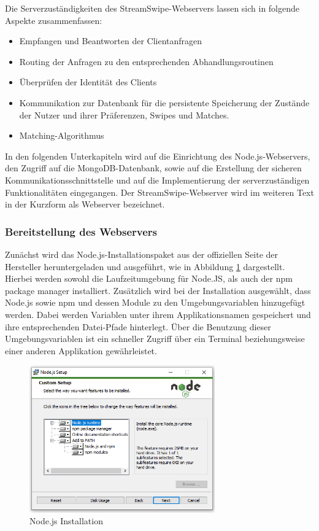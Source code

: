 Die Serverzuständigkeiten des StreamSwipe-Webservers lassen sich in folgende Aspekte zusammenfassen:
\begin{itemize}
\item Empfangen und Beantworten der Clientanfragen
\item Routing der Anfragen zu den entsprechenden Abhandlungsroutinen
\item Überprüfen der Identität des Clients
\item Kommunikation zur Datenbank für die persistente Speicherung der Zustände der Nutzer und ihrer Präferenzen, Swipes und Matches.
\item Matching-Algorithmus
\end{itemize} 

\noindent
In den folgenden Unterkapiteln wird auf die Einrichtung des Node.js-Webservers, den Zugriff auf die MongoDB-Datenbank, sowie auf die Erstellung der sicheren Kommunikationsschnittstelle und auf die Implementierung der serverzuständigen Funktionalitäten eingegangen. Der StreamSwipe-Webserver wird im weiteren Text in der Kurzform als Webserver bezeichnet. 

\subsubsection{Bereitstellung des Webservers}
Zunächst wird das Node.js-Installationspaket aus der offiziellen Seite der Hersteller heruntergeladen und ausgeführt, wie in Abbildung \ref{fig:installation_nodejs} dargestellt. Hierbei werden sowohl die Laufzeitumgebung für Node.JS, als auch der npm package manager installiert. 
Zusätzlich wird bei der Installation ausgewählt, dass Node.js sowie npm und dessen Module zu den Umgebungsvariablen hinzugefügt werden. Dabei werden Variablen unter ihrem Applikationsnamen gespeichert und ihre entsprechenden Datei-Pfade hinterlegt.
Über die Benutzung dieser Umgebungsvariablen ist ein schneller Zugriff über ein Terminal beziehungsweise einer anderen Applikation gewährleistet.


\begin{figure}[tbt]
\centering
\includegraphics[width=8cm]{images/nodejs_install.png}
\caption{Node.js Installation}
\label{fig:installation_nodejs}
\end{figure}

